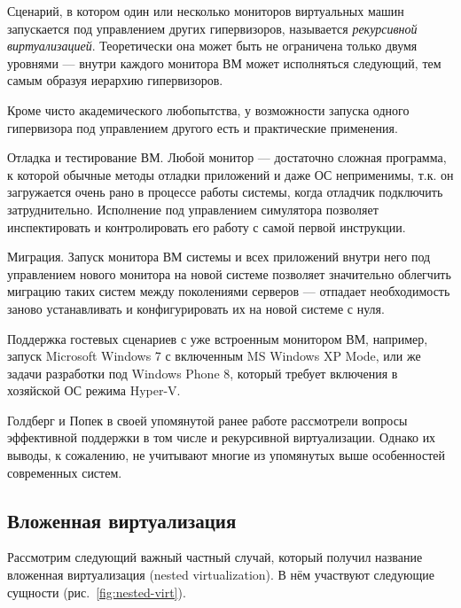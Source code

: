 
Сценарий, в котором один или несколько мониторов виртуальных машин запускается под управлением других гипервизоров, называется \textit{рекурсивной виртуализацией}. Теоретически она может быть не ограничена только двумя уровнями --- внутри каждого монитора ВМ может исполняться следующий, тем самым образуя иерархию гипервизоров.

Кроме чисто академического любопытства, у возможности запуска одного гипервизора под управлением другого есть и практические применения.

\begin{itemize*}
    \item Отладка и тестирование ВМ. Любой монитор --- достаточно сложная программа, к которой обычные методы отладки приложений и даже ОС неприменимы, т.к. он загружается очень рано в процессе работы системы, когда отладчик подключить затруднительно. Исполнение под управлением симулятора позволяет инспектировать и контролировать его работу с самой первой инструкции.
    \item Миграция. Запуск монитора ВМ системы и всех приложений внутри него под управлением нового монитора на новой системе позволяет значительно облегчить миграцию таких систем между поколениями серверов --- отпадает необходимость заново устанавливать и конфигурировать их на новой системе с нуля.
    \item Поддержка гостевых сценариев с уже встроенным монитором ВМ, например, запуск Microsoft Windows 7 с включенным MS Windows XP Mode, или же задачи разработки под Windows Phone 8, который требует включения в хозяйской ОС режима Hyper-V.
\end{itemize*}

Голдберг и Попек в своей упомянутой ранее работе рассмотрели вопросы эффективной поддержки в том числе и рекурсивной виртуализации. Однако их выводы, к сожалению, не учитывают многие из упомянутых выше особенностей современных систем.

\subsection{Вложенная виртуализация}

Рассмотрим следующий важный частный случай, который получил название вложенная виртуализация (\abbr nested virtualization). В нём участвуют следующие сущности (рис.~\ref{fig:nested-virt}).

